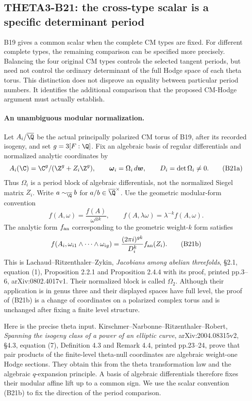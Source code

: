 \subsection{THETA3-B21: the cross-type scalar is a specific determinant period}\label{B21}

B19 gives a common scalar when the complete CM types are fixed.
For different complete types, the remaining comparison can be
specified more precisely.  Balancing the four original CM types
controls the selected tangent periods, but need not control the
ordinary determinant of the full Hodge space of each theta torus.
This distinction does not disprove an equality between particular
period numbers.  It identifies the additional comparison that
the proposed CM-Hodge argument must actually establish.

\paragraph{An unambiguous modular normalization.}
Let $A_i/\overline\Q$ be the actual principally polarized CM
torus of B19, after its recorded isogeny, and set
$g=3[F:\Q]$.  Fix an algebraic basis of regular differentials
and normalized analytic coordinates by
\[
 A_i(\C)=\C^g/(\Z^g+Z_i\Z^g),\qquad
 \boldsymbol\omega_i=\Omega_i\,d\boldsymbol w,
 \qquad D_i=\det\Omega_i\ne0.
 \tag{B21a}
\]
Thus $\Omega_i$ is a period block of algebraic differentials,
not the normalized Siegel matrix $Z_i$.
Write $a\sim_{\overline\Q}b$ for
$a/b\in\overline\Q^\times$.
Use the geometric modular-form convention
\[
 f(A,\omega)=\frac{f(A)}{\omega^{\otimes k}},\qquad
 f(A,\lambda\omega)=\lambda^{-k}f(A,\omega).
\]
The analytic form $f_{\rm an}$ corresponding to the geometric
weight-$k$ form satisfies
\[
 f(A_i,\omega_{i1}\wedge\cdots\wedge\omega_{ig})
       =\frac{(2\pi i)^{gk}}{D_i^k}f_{\rm an}(Z_i).
 \tag{B21b}
\]
This is Lachaud--Ritzenthaler--Zykin,
\emph{Jacobians among abelian threefolds},
\S2.1, equation (1), Proposition 2.2.1 and Proposition 2.4.4
with its proof, printed pp.3--6, arXiv:0802.4017v1.
Their normalized block is called $\Omega_2$.
Although their application is in genus three and their displayed
spaces have full level, the proof of (B21b) is a change of
coordinates on a polarized complex torus and is unchanged after
fixing a finite level structure.

Here is the precise theta input.  Kirschmer--Narbonne--Ritzenthaler--Robert,
\emph{Spanning the isogeny class of a power of an elliptic curve},
arXiv:2004.08315v2, \S4.3, equation (7), Definition 4.3 and
Remark 4.4, printed pp.23--24, prove that pair products of the
finite-level theta-null coordinates are algebraic weight-one
Hodge sections.  They obtain this from the theta transformation
law and the algebraic $q$-expansion principle.  A basis of
algebraic differentials therefore fixes their modular affine
lift up to a common sign.  We use the scalar convention
(B21b) to fix the direction of the period comparison.


